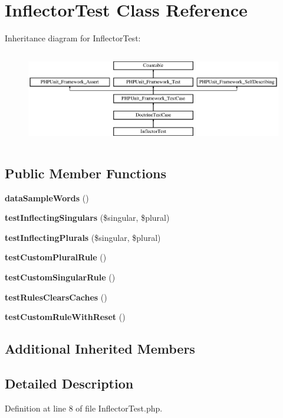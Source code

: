 \section{Inflector\+Test Class Reference}
\label{class_doctrine_1_1_tests_1_1_common_1_1_inflector_1_1_inflector_test}
Inheritance diagram for Inflector\+Test\+:\begin{figure}[H]
\begin{center}
\leavevmode
\includegraphics[height=4.129793cm]{class_doctrine_1_1_tests_1_1_common_1_1_inflector_1_1_inflector_test}
\end{center}
\end{figure}
\subsection*{Public Member Functions}
\begin{DoxyCompactItemize}
\item 
{\bf data\+Sample\+Words} ()
\item 
{\bf test\+Inflecting\+Singulars} (\$singular, \$plural)
\item 
{\bf test\+Inflecting\+Plurals} (\$singular, \$plural)
\item 
{\bf test\+Custom\+Plural\+Rule} ()
\item 
{\bf test\+Custom\+Singular\+Rule} ()
\item 
{\bf test\+Rules\+Clears\+Caches} ()
\item 
{\bf test\+Custom\+Rule\+With\+Reset} ()
\end{DoxyCompactItemize}
\subsection*{Additional Inherited Members}


\subsection{Detailed Description}


Definition at line 8 of file Inflector\+Test.\+php.




